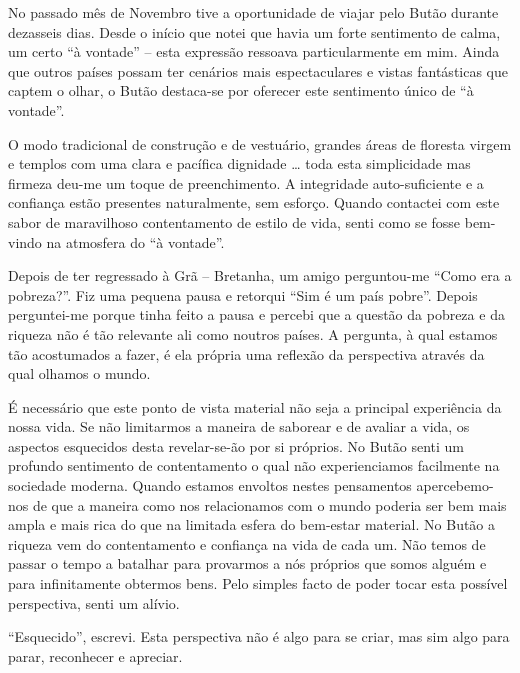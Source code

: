 No passado mês de Novembro tive a oportunidade de viajar pelo Butão
durante dezasseis dias. Desde o início que notei que havia um forte
sentimento de calma, um certo ``à vontade'' -- esta expressão ressoava
particularmente em mim. Ainda que outros países possam ter cenários mais
espectaculares e vistas fantásticas que captem o olhar, o Butão
destaca-se por oferecer este sentimento único de ``à vontade''.

O modo tradicional de construção e de vestuário, grandes áreas de
floresta virgem e templos com uma clara e pacífica dignidade \ldots{}
toda esta simplicidade mas firmeza deu-me um toque de preenchimento. A
integridade auto-suficiente e a confiança estão presentes naturalmente,
sem esforço. Quando contactei com este sabor de maravilhoso
contentamento de estilo de vida, senti como se fosse bem-vindo na
atmosfera do ``à vontade''.

Depois de ter regressado à Grã -- Bretanha, um amigo perguntou-me ``Como
era a pobreza?''. Fiz uma pequena pausa e retorqui ``Sim é um país
pobre''. Depois perguntei-me porque tinha feito a pausa e percebi que a
questão da pobreza e da riqueza não é tão relevante ali como noutros
países. A pergunta, à qual estamos tão acostumados a fazer, é ela
própria uma reflexão da perspectiva através da qual olhamos o mundo.

É necessário que este ponto de vista material não seja a principal
experiência da nossa vida. Se não limitarmos a maneira de saborear e de
avaliar a vida, os aspectos esquecidos desta revelar-se-ão por si
próprios. No Butão senti um profundo sentimento de contentamento o qual
não experienciamos facilmente na sociedade moderna. Quando estamos
envoltos nestes pensamentos apercebemo-nos de que a maneira como nos
relacionamos com o mundo poderia ser bem mais ampla e mais rica do que
na limitada esfera do bem-estar material. No Butão a riqueza vem do
contentamento e confiança na vida de cada um. Não temos de passar o
tempo a batalhar para provarmos a nós próprios que somos alguém e para
infinitamente obtermos bens. Pelo simples facto de poder tocar esta
possível perspectiva, senti um alívio.

``Esquecido'', escrevi. Esta perspectiva não é algo para se criar, mas
sim algo para parar, reconhecer e apreciar.

